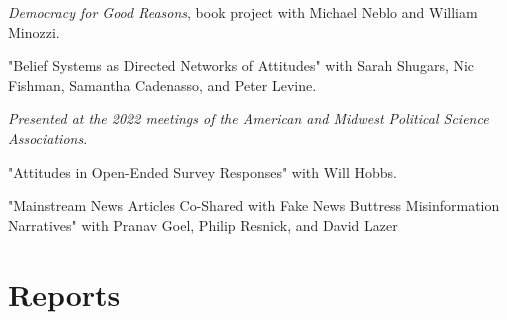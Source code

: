 \documentclass[letterpaper]{article}
\renewenvironment{itemize}{
  \begin{list}{}{
    \setlength{\leftmargin}{1.5em}
  }
}{
  \end{list}
}
\begin{document}
\begin{itemize}

\item \textit{Democracy for Good Reasons}, book project with Michael Neblo and William Minozzi.

\item "Belief Systems as Directed Networks of Attitudes" with Sarah Shugars, Nic Fishman, Samantha Cadenasso, and Peter Levine.
\begin{itemize}
\item \textit{Presented at the 2022 meetings of the American and Midwest Political Science Associations}.
\end{itemize} 

\item "Attitudes in Open-Ended Survey Responses" with Will Hobbs.

\item "Mainstream News Articles Co-Shared with Fake News Buttress Misinformation Narratives" with Pranav Goel, Philip Resnick, and David Lazer



\end{itemize}

\section*{Reports}
\end{document}
